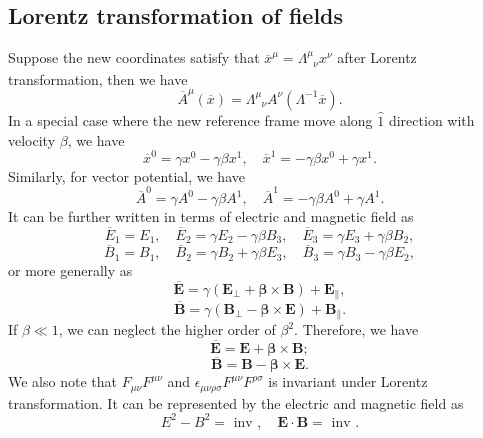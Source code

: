 \subsection{Lorentz transformation of fields}
Suppose the new coordinates satisfy that $\overline{x}^{\mu} = \Lambda^{\mu}_{\phantom{\mu}\nu}x^{\nu}$ after Lorentz transformation, then we have
\[\overline{A}^{\mu}(\overline{x}) = \Lambda^{\mu}_{\phantom{\mu}\nu}A^{\nu}(\Lambda^{-1}\overline{x}).\]
In a special case where the new reference frame move along $\hat{1}$ direction with velocity $\beta$, we have
\[\overline{x}^{0} = \gamma x^0 - \gamma \beta x^1 , \quad \overline{x}^{1} = -\gamma \beta x^0 + \gamma x^1.\]
Similarly, for vector potential, we have 
\[\overline{A}^{0} = \gamma A^0 - \gamma \beta A^1 , \quad \overline{A}^{1} = -\gamma \beta A^0 + \gamma A^1.\]
It can be further written in terms of electric and magnetic field as
\[\overline{E}_1 = E_1 , \quad \overline{E}_2 = \gamma E_2 - \gamma \beta B_3 , \quad \overline{E}_3 = \gamma E_3 + \gamma \beta B_2,\]
\[\overline{B}_1 = B_1 , \quad \overline{B}_2 = \gamma B_2 + \gamma \beta E_3 , \quad \overline{B}_3 = \gamma B_3 - \gamma \beta E_2,\]
or more generally as
\[\bm{\overline{E}} = \gamma(\bm{E}_{\perp} + \bm{\beta} \times \bm{B}) + \bm{E}_{\parallel},\]
\[\bm{\overline{B}} = \gamma(\bm{B}_{\perp} - \bm{\beta} \times \bm{E}) + \bm{B}_{\parallel}.\]
If $\beta \ll 1$, we can neglect the higher order of $\beta^2$. Therefore, we have
\[\bm{\overline{E}} = \bm{E} + \bm{\beta} \times \bm{B};\]
\[\bm{\overline{B}} = \bm{B} - \bm{\beta} \times \bm{E}.\]
We also note that $F_{\mu\nu}F^{\mu\nu}$ and $\epsilon_{\mu\nu\rho\sigma}F^{\mu\nu}F^{\rho\sigma}$ is invariant under Lorentz transformation. It can be represented by the electric and magnetic field as
\[E^2 - B^2 = \mbox{ inv } , \quad \bm{E} \cdot \bm{B} = \mbox{ inv }.\]

